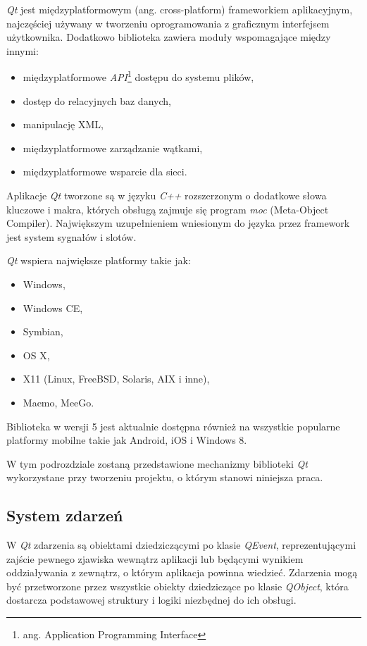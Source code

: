 \emph{Qt} jest międzyplatformowym (ang. cross-platform) frameworkiem aplikacyjnym, najczęściej używany w tworzeniu oprogramowania z graficznym interfejsem użytkownika.
Dodatkowo biblioteka zawiera moduły wspomagające między innymi:
\begin{itemize}
\item międzyplatformowe \emph{API}\footnote{ang. Application Programming Interface} dostępu do systemu plików,
\item dostęp do relacyjnych baz danych,
\item manipulację XML,
\item międzyplatformowe zarządzanie wątkami,
\item międzyplatformowe wsparcie dla sieci.
\end{itemize}

Aplikacje \emph{Qt} tworzone są w języku \emph{C++} rozszerzonym o dodatkowe słowa kluczowe i makra, których obsługą zajmuje się program \emph{moc} (Meta-Object Compiler). Największym uzupełnieniem wniesionym do języka przez framework jest system sygnałów i slotów.

\emph{Qt} wspiera największe platformy takie jak:
\begin{itemize}
\item Windows,
\item Windows CE,
\item Symbian,
\item OS X,
\item X11 (Linux, FreeBSD, Solaris, AIX i inne),
\item Maemo, MeeGo.
\end{itemize}

Biblioteka w wersji 5 jest aktualnie dostępna również na wszystkie popularne platformy mobilne takie jak Android, iOS i Windows 8.

W tym podrozdziale zostaną przedstawione mechanizmy biblioteki \emph{Qt} wykorzystane przy tworzeniu projektu, o którym stanowi niniejsza praca. 

\subsection{System zdarzeń}
W \emph{Qt} zdarzenia są obiektami dziedziczącymi po klasie \emph{QEvent}, reprezentującymi zajście pewnego zjawiska wewnątrz aplikacji lub będącymi wynikiem oddziaływania z zewnątrz, o którym aplikacja powinna wiedzieć. Zdarzenia mogą być przetworzone przez wszystkie obiekty dziedziczące po klasie \emph{QObject}, która dostarcza podstawowej struktury i logiki niezbędnej do ich obsługi. 

